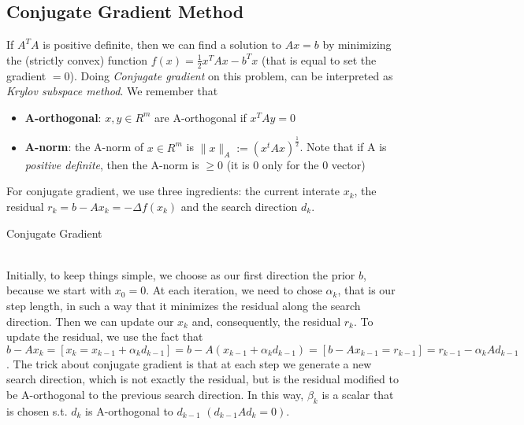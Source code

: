 \documentclass{article}
\begin{document}
\subsection{Conjugate Gradient Method}
If $A^{T}A$ is positive definite, then we can find a solution to $Ax = b$ by minimizing the (strictly convex) function $f(x) = \frac{1}{2}x^{T}Ax - b^{T}x$ (that is equal to set the gradient $= 0$). Doing \textit{Conjugate gradient} on this problem, can be interpreted as \textit{Krylov subspace method}. We remember that \begin{itemize}
\item \textbf{A-orthogonal}: $x, y \in R^{m}$ are A-orthogonal if $x^{T}Ay = 0$
\item \textbf{A-norm}: the A-norm of $x \in R^{m}$ is $\|x\|_{A} := (x^{t}Ax)^{\frac{1}{2}}$. Note that if A is \textit{positive definite}, then the A-norm is $\geq 0$ (it is $0$ only for the $0$ vector)
\end{itemize}
For conjugate gradient, we use three ingredients: the current interate $x_{k}$, the residual $r_{k} = b - Ax_{k} = -\Delta f(x_{k})$ and the search direction $d_{k}$.
\makeatletter
\def\BState{\State\hskip-\ALG@thistlm}
\makeatother
\begin{algorithm}
\caption{Conjugate Gradient}\label{euclid}
\end{algorithm}
\\Initially, to keep things simple, we choose as our first direction the prior $b$, because we start with $x_{0} = 0$. At each iteration, we need to chose $\alpha_{k}$, that is our step length, in such a way that it minimizes the residual along the search direction. Then we can update our $x_{k}$ and, consequently, the residual $r_{k}$. To update the residual, we use the fact that $b - Ax_{k} = [x_{k} = x_{k-1} + \alpha_{k}d_{k-1}] = b - A(x_{k-1} + \alpha_{k}d_{k-1}) = [b-Ax_{k-1} = r_{k-1}] = r_{k-1} - \alpha_{k}Ad_{k-1}$. The trick about conjugate gradient is that at each step we generate a new search direction, which is not exactly the residual, but is the residual modified to be A-orthogonal to the previous search direction. In this way, $\beta_{k}$ is a scalar that is chosen s.t. $d_{k}$ is A-orthogonal to $d_{k-1}$ $(d_{k-1}Ad_{k} = 0)$. 
\end{document}
